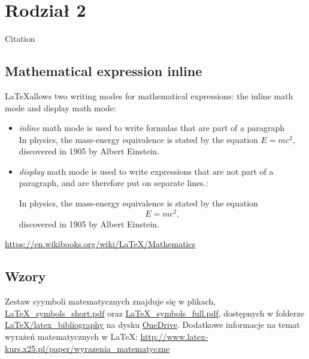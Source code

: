 \newpage %
\section{Rodział 2}

Citation \citep{Wanninger1993}

\citet{Bertiger.etal2009}

\subsection{Mathematical expression inline}


La\TeX allows two writing modes for mathematical expressions: the inline math mode and display math mode:
\begin{itemize}
	\item \emph{inline} math mode is used to write formulas that are part of a paragraph \\
	
	In physics, the mass-energy equivalence is stated by the equation $E=mc^2$, discovered in 1905 by Albert Einstein.
	
	
	\item \emph{display} math mode is used to write expressions that are not part of a paragraph, and are therefore put on separate lines.: 
	
	In physics, the mass-energy equivalence is stated by the equation
	\begin{equation}
		E=mc^2,
	\end{equation}
	discovered in 1905 by Albert Einstein.
\end{itemize}

\url{https://en.wikibooks.org/wiki/LaTeX/Mathematics}


\subsection{Wzory}
Zestaw syymboli matematycznych znajduje się w plikach, \url{LaTeX_symbols_short.pdf}
oraz \url{LaTeX_symbols_full.pdf}, dostępnych w folderze \url{LaTeX/latex_bibliography} na dysku \href{https://wutwaw-my.sharepoint.com/:f:/g/personal/kinga_wezka_pw_edu_pl/EjJEPFmm2bFKvw8gDpzh20QBpIyHB2EN0uaUE3e4bqPH9w?e=OBLJ3e}{OneDrive}.
Dodatkowe informacje na temat wyrażeń matematycznych w La\TeX{}:
\url{http://www.latex-kurs.x25.pl/paper/wyrazenia_matematyczne}




